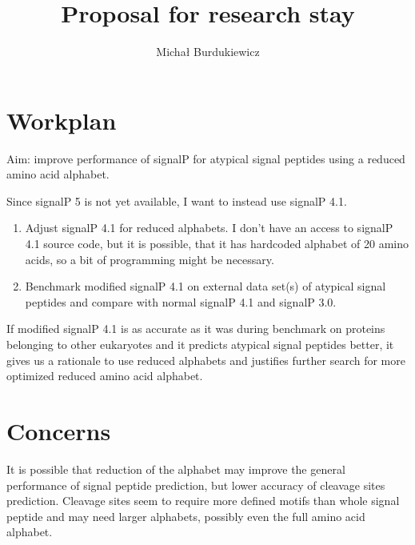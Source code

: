 \documentclass{article}
\title{Proposal for research stay}
\author{Micha\l{} Burdukiewicz}
\begin{document}
\maketitle
\section{Workplan}


Aim: improve performance of signalP for atypical signal peptides using a reduced amino acid alphabet.

Since signalP 5 is not yet available, I want to instead use signalP 4.1.

\begin{enumerate}
\item Adjust signalP 4.1 for reduced alphabets. I don't have an access to signalP 4.1 source code, but it is possible, that it has hardcoded alphabet of 20 amino acids, so a bit of programming might be necessary.
\item Benchmark modified signalP 4.1 on external data set(s) of atypical signal peptides and compare with normal signalP 4.1 and signalP 3.0.
\end{enumerate}

If modified signalP 4.1 is as accurate as it was during benchmark on proteins belonging to other eukaryotes and it predicts atypical signal peptides better, it gives us a rationale to use reduced alphabets and justifies further search for more optimized reduced amino acid alphabet.

\section{Concerns}

It is possible that reduction of the alphabet may improve the general performance of signal peptide prediction, but lower accuracy of cleavage sites prediction. Cleavage sites seem to require more defined motifs than whole signal peptide and may need larger alphabets, possibly even the full amino acid alphabet.
\end{document}
